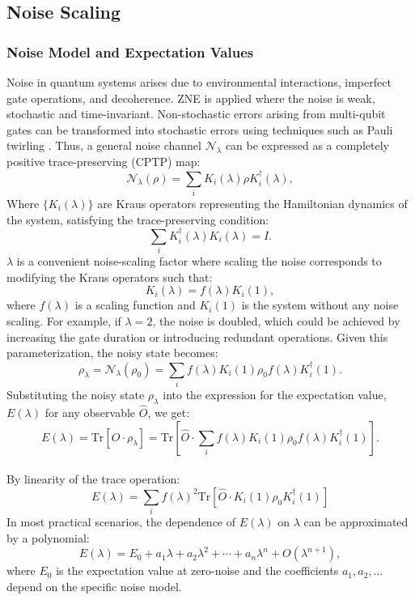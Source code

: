 \documentclass[12pt]{article}
\begin{document}
\subsection{Noise Scaling}
\subsubsection{Noise Model and Expectation Values}
Noise in quantum systems arises due to environmental interactions, imperfect gate operations, and decoherence. ZNE is applied where the noise is weak, stochastic and time-invariant. Non-stochastic errors arising from multi-qubit gates can be transformed into stochastic errors using techniques such as Pauli twirling \cite{li-PhysRevX.7.021050}. Thus, a general noise channel $\mathcal{N}_\lambda$ can be expressed as a completely positive trace-preserving (CPTP) map:
\begin{equation}
\mathcal{N}_\lambda(\rho) = \sum_i K_i(\lambda) \rho K_i^\dagger(\lambda),
\end{equation}
Where $\{K_i(\lambda)\}$ are Kraus operators representing the Hamiltonian dynamics of the system, satisfying the trace-preserving condition:
\begin{equation}
\sum_i K_i^\dagger(\lambda) K_i(\lambda) = I.
\end{equation}
$\lambda$ is a convenient noise-scaling factor where scaling the noise corresponds to modifying the Kraus operators such that:
\begin{equation}
K_i(\lambda) = f(\lambda) K_i(1),
\end{equation}
where $f(\lambda)$ is a scaling function and $K_i(1)$ is the system without any noise scaling. For example, if $\lambda = 2$, the noise is doubled, which could be achieved by increasing the gate duration or introducing redundant operations. Given this parameterization, the noisy state becomes:
\begin{equation}
\rho_\lambda = \mathcal{N}_\lambda(\rho_0) = \sum_i f(\lambda) K_i(1) \rho_0 f(\lambda) K_i^\dagger(1).
\end{equation}
Substituting the noisy state $\rho_\lambda$ into the expression for the expectation value, $E(\lambda)$ for any observable $\hat{O}$, we get:
\begin{equation}
E(\lambda) = \text{Tr}\left[\hat{O} \cdot \rho_\lambda \right] = \text{Tr}\left[\hat{O} \cdot \sum_i f(\lambda) K_i(1) \rho_0 f(\lambda) K_i^\dagger(1) \right].
\end{equation} \\
By linearity of the trace operation:
\begin{equation}
E(\lambda) = \sum_i f(\lambda)^2 \text{Tr}\left[\hat{O} \cdot K_i(1) \rho_0 K_i^\dagger(1) \right] \tag{11.1}\label{eq:11.1}
\end{equation}
In most practical scenarios, the dependence of $E(\lambda)$ on $\lambda$ can be approximated by a polynomial:
\begin{equation}
E(\lambda) = E_0 + a_1 \lambda + a_2 \lambda^2 + \cdots + a_n \lambda^n + O(\lambda^{n+1}),  
\end{equation}
where $E_0$ is the expectation value at zero-noise and the coefficients $a_1, a_2, \ldots$ depend on the specific noise model.
\end{document}
